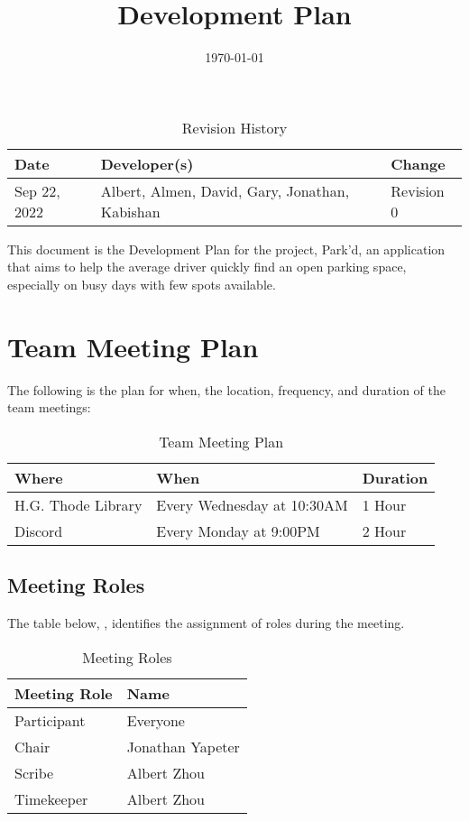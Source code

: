 \documentclass[12pt,letterpaper]{article}
\title{Development Plan\\\progname}
\author{\authname}
\date{\today}
\begin{document}
\maketitle

\newpage
\begin{table}[hp]
\caption{Revision History} \label{TblRevisionHistory}
\begin{tabularx}{\textwidth}{lll}
\toprule
\textbf{Date} & \textbf{Developer(s)} & \textbf{Change}\\
\midrule
Sep 22, 2022 & Albert, Almen, David, Gary, Jonathan, Kabishan & Revision 0\\
\bottomrule
\end{tabularx}
\end{table}

\newpage
\tableofcontents
\newpage
\listoftables
\newpage

This document is the Development Plan for the project, Park'd, an application
that aims to help the average driver quickly find an open parking space,
especially on busy days with few spots available.
\section{Team Meeting Plan}
\label{TeamMeetingPlan}
The following is the plan for when, the location, frequency, and duration of the
team meetings:
\begin{table}[hp]
\begin{tabularx}{\textwidth}{|l|l|X|}
\toprule
\textbf{Where} & \textbf{When} & \textbf{Duration}\\
\midrule
H.G. Thode Library & Every Wednesday at 10:30AM & 1 Hour\\
Discord & Every Monday at 9:00PM & 2 Hour\\
\bottomrule
\end{tabularx}
\caption{Team Meeting Plan} \label{tab:teamMeetingPlan}
\end{table}

\subsection{Meeting Roles}
\label{meetingRoles}
The table below, , identifies the assignment of roles
during the meeting.
\begin{table}[hp] 
    \centering
    \begin{tabularx}{\textwidth}{|X|X|}
        \toprule
        \textbf{Meeting Role} & \textbf{Name}\\
        \midrule
        Participant & Everyone\\
        Chair & Jonathan Yapeter\\
        Scribe & Albert Zhou\\
        Timekeeper & Albert Zhou\\
        \bottomrule
    \end{tabularx}
\caption{Meeting Roles} 
\label{meetingRolesTable}
\end{table}
\end{document}
